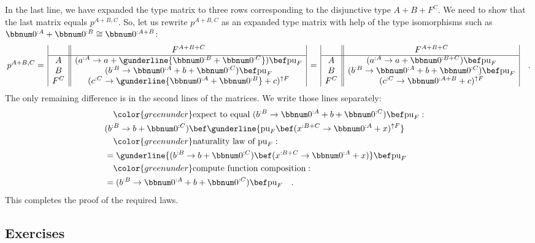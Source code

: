 In the last line, we have expanded the type matrix to three rows corresponding
to the disjunctive type $A+B+F^{C}$. We need to show that the last
matrix equals $p^{A+B,C}$. So, let us rewrite $p^{A+B,C}$ as an
expanded type matrix with help of  the type isomorphisms such as $\bbnum 0^{:A}+\bbnum 0^{:B}\cong\bbnum 0^{:A+B}$:
\[
p^{A+B,C}=\,\begin{array}{|c||c|}
 & F^{A+B+C}\\
\hline A & (a^{:A}\rightarrow a+\gunderline{\bbnum 0^{:B}+\bbnum 0^{:C}})\bef\text{pu}_{F}\\
B & (b^{:B}\rightarrow\bbnum 0^{:A}+b+\bbnum 0^{:C})\bef\text{pu}_{F}\\
F^{C} & (c^{:C}\rightarrow\gunderline{\bbnum 0^{:A}+\bbnum 0^{:B}}+c)^{\uparrow F}
\end{array}\,=\,\begin{array}{|c||c|}
 & F^{A+B+C}\\
\hline A & (a^{:A}\rightarrow a+\bbnum 0^{:B+C})\bef\text{pu}_{F}\\
B & (b^{:B}\rightarrow\bbnum 0^{:A}+b+\bbnum 0^{:C})\bef\text{pu}_{F}\\
F^{C} & (c^{:C}\rightarrow\bbnum 0^{:A+B}+c)^{\uparrow F}
\end{array}\quad.
\]
The only remaining difference is in the second lines of the matrices.
We write those lines separately: 
\begin{align*}
 & \quad{\color{greenunder}\text{expect to equal }(b^{:B}\rightarrow\bbnum 0^{:A}+b+\bbnum 0^{:C})\bef\text{pu}_{F}:}\quad\\
 & (b^{:B}\rightarrow b+\bbnum 0^{:C})\bef\gunderline{\text{pu}_{F}\bef(x^{:B+C}\rightarrow\bbnum 0^{:A}+x)^{\uparrow F}}\\
 & \quad{\color{greenunder}\text{naturality law of }\text{pu}_{F}:}\quad\\
 & =\gunderline{(b^{:B}\rightarrow b+\bbnum 0^{:C})\bef(x^{:B+C}\rightarrow\bbnum 0^{:A}+x)}\bef\text{pu}_{F}\\
 & \quad{\color{greenunder}\text{compute function composition}:}\quad\\
 & =(b^{:B}\rightarrow\bbnum 0^{:A}+b+\bbnum 0^{:C})\bef\text{pu}_{F}\quad.
\end{align*}
This completes the proof of the required laws.

\subsection{Exercises}


